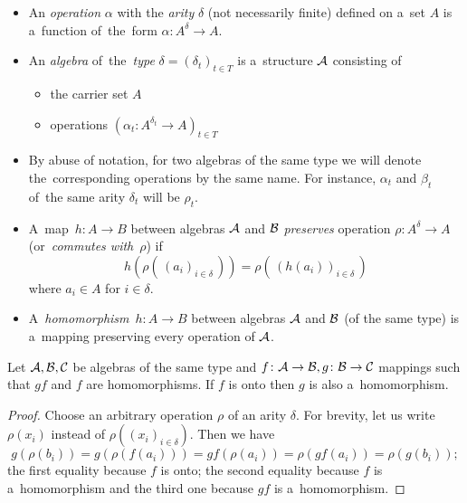 \begin{itemize}
\item An \emph{operation\/} $\alpha$ with the \emph{arity\/} $\delta$ (not
necessarily finite) defined on a~set $A$ is a~function of~the~form
$\alpha\colon A^{\delta} \to A$.

\item An \emph{algebra\/} of~the~\emph{type\/} $\delta = (\delta_t)_{t\in T}$
is a~structure $\mathcal{A}$ consisting of
  \begin{itemize}
  \item the carrier set $A$
  \item operations $(\alpha_t\colon A^{\delta_t} \to A)_{t\in T}$
  \end{itemize}

\item By abuse of notation, for two algebras of the same type we will denote
the~corresponding operations by the same name.
For instance, $\alpha_t$ and $\beta_t$ of~the same arity $\delta_t$ will be
$\rho_t$.

\item A~map~$h\colon A \to B$ between algebras $\mathcal{A}$ and $\mathcal{B}$
\emph{preserves\/} operation $\rho\colon A^\delta \to A$ (or~\emph{commutes
with\/}~$\rho$) if
\[
  h( \rho(\, (a_i)_{i\in \delta}\,)) = \rho(\, (h(a_i))_{i\in \delta}\, )
\]
where $a_i\in A$ for $i\in \delta$.

\item A~\emph{homomorphism\/}~$h\colon A \to B$ between algebras $\mathcal{A}$ and
$\mathcal{B}$ (of the same type) is a~mapping preserving every operation of $\mathcal{A}$.
\end{itemize}

\begin{lem} \label{lem:onto->homo}
  Let $\mathcal{A}, \mathcal{B}, \mathcal{C}$ be algebras of the same type and $f\colon \mathcal{A} \to
  \mathcal{B}, g\colon \mathcal{B} \to \mathcal{C}$ mappings such that $gf$ and $f$ are
  homomorphisms.
  If $f$ is onto then $g$ is also a~homomorphism.
\end{lem}
\begin{proof}
  Choose an arbitrary operation $\rho$ of an arity $\delta$.
  For brevity, let us write $\rho(x_i)$ instead of $\rho((x_i)_{i\in \delta})$.
  Then we have
  \[
    g( \rho(b_i) )
    = g( \rho(f(a_i)) )
    = gf( \rho(a_i) )
    = \rho( gf(a_i) )
    = \rho( g(b_i) );
  \]
  the first equality because $f$ is onto;
  the second equality because $f$ is a~homomorphism and the third one because
  $gf$ is a~homomorphism.
\end{proof}

